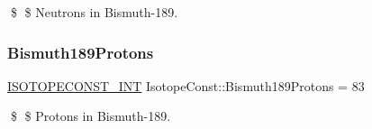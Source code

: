 \$ \$ Neutrons in Bismuth-\/189. \mbox{\label{group___isotope_const-_bismuth-_bi189_ga55c5cb5ac50fde1ac1f69072e53bedf8}} 
\subsubsection{\texorpdfstring{Bismuth189\+Protons}{Bismuth189Protons}}
{\footnotesize\ttfamily \mbox{\hyperlink{group___isotope_const-_macros_ga5f18360b3e99483a35c32d789e62621c}{I\+S\+O\+T\+O\+P\+E\+C\+O\+N\+S\+T\+\_\+\+I\+NT}} Isotope\+Const\+::\+Bismuth189\+Protons = 83}

\$ \$ Protons in Bismuth-\/189. 